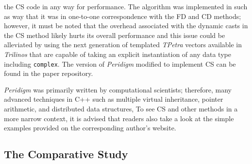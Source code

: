 \documentclass[preprint,12pt]{elsarticle}
\begin{document}
the CS code in any way for performance. The algorithm  was implemented in such
as way that it was in one-to-one correspondence with the FD and CD methods;
however, it must be noted that the overhead associated with the dynamic casts
in the CS method likely hurts its overall performance and this issue could be
alleviated by using the next generation of templated \emph{TPetra} vectors
available in \emph{Trilinos} that are capable of taking an explicit
instantiation of any data type including {\tt complex}.  The version of \emph{Peridigm}
modified to implement CS can be found in the paper repository.  

\emph{Peridigm} was primarily written by computational scientists; therefore,
many advanced techniques in C++ such as multiple virtual inheritance, pointer
arithmetic, and distributed data structures,  To see CS and other methods in a more narrow context,
it is advised that readers also take a look at the simple examples provided on
the corresponding author's website.

\subsection{The Comparative Study} 
\label{tcs}
\end{document}
